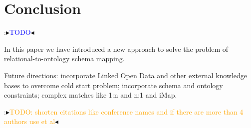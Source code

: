 \documentclass[letterpaper]{article} %
\newcommand{\authornote}[3]{
  {\fbox{\sc 
  #1}:$\blacktriangleright$\textcolor{#2}{\small{#3}}$\blacktriangleleft$}%
}
\newcommand{\ddg}[1]{\authornote{DDG}{blue}{#1}}
\newcommand{\npr}[1]{\authornote{NPR}{orange}{#1}}
\begin{document}
\section{Conclusion}
\ddg{TODO} 
In this paper we have introduced a new approach to solve the problem of relational-to-ontology schema mapping.

Future directions:
incorporate Linked Open Data and other external knowledge bases to overcome cold start problem;
incorporate schema and ontology constraints;
complex matches like 1:n and n:1 and iMap.


\npr{TODO: shorten citations like conference names and if there are more than 4 authors use et al}

\end{document}
